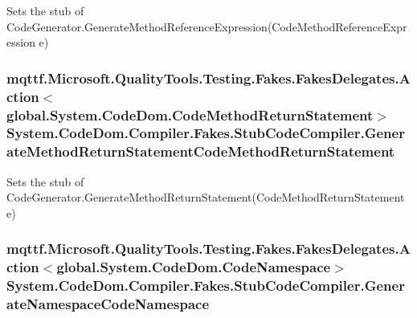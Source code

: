 Sets the stub of Code\-Generator.\-Generate\-Method\-Reference\-Expression(\-Code\-Method\-Reference\-Expression e)

\hypertarget{class_system_1_1_code_dom_1_1_compiler_1_1_fakes_1_1_stub_code_compiler_a34b69a65e9845cda30f44e09d3dd109f}{
\subsubsection[{Generate\-Method\-Return\-Statement\-Code\-Method\-Return\-Statement}]{\setlength{\rightskip}{0pt plus 5cm}mqttf.\-Microsoft.\-Quality\-Tools.\-Testing.\-Fakes.\-Fakes\-Delegates.\-Action$<$global.\-System.\-Code\-Dom.\-Code\-Method\-Return\-Statement$>$ System.\-Code\-Dom.\-Compiler.\-Fakes.\-Stub\-Code\-Compiler.\-Generate\-Method\-Return\-Statement\-Code\-Method\-Return\-Statement}}\label{class_system_1_1_code_dom_1_1_compiler_1_1_fakes_1_1_stub_code_compiler_a34b69a65e9845cda30f44e09d3dd109f}


Sets the stub of Code\-Generator.\-Generate\-Method\-Return\-Statement(\-Code\-Method\-Return\-Statement e)

\hypertarget{class_system_1_1_code_dom_1_1_compiler_1_1_fakes_1_1_stub_code_compiler_a5dcd7b86cc638e6b87c5d465abbe9633}{
\subsubsection[{Generate\-Namespace\-Code\-Namespace}]{\setlength{\rightskip}{0pt plus 5cm}mqttf.\-Microsoft.\-Quality\-Tools.\-Testing.\-Fakes.\-Fakes\-Delegates.\-Action$<$global.\-System.\-Code\-Dom.\-Code\-Namespace$>$ System.\-Code\-Dom.\-Compiler.\-Fakes.\-Stub\-Code\-Compiler.\-Generate\-Namespace\-Code\-Namespace}}\label{class_system_1_1_code_dom_1_1_compiler_1_1_fakes_1_1_stub_code_compiler_a5dcd7b86cc638e6b87c5d465abbe9633}


